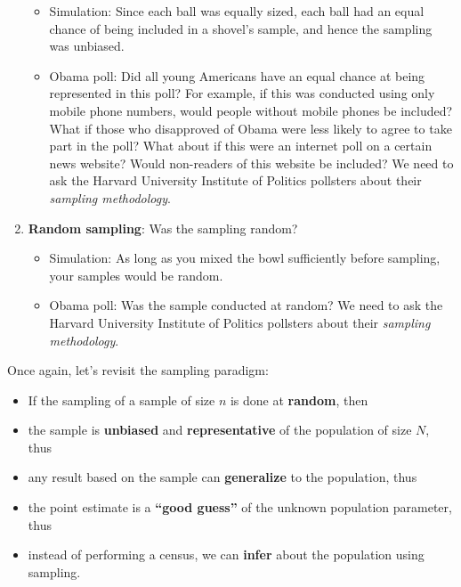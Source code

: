 \documentclass[12pt, krantz2,]{krantz}
\providecommand{\tightlist}{%
  \setlength{\itemsep}{0pt}\setlength{\parskip}{0pt}}
\renewenvironment{quote}{\begin{VF}}{\end{VF}}
\begin{document}
\begin{enumerate}
  \begin{itemize}
  \tightlist
  \item
    Simulation: Since each ball was equally sized, each ball had an equal chance of being included in a shovel's sample, and hence the sampling was unbiased.
  \item
    Obama poll: Did all young Americans have an equal chance at being represented in this poll? For example, if this was conducted using only mobile phone numbers, would people without mobile phones be included? What if those who disapproved of Obama were less likely to agree to take part in the poll? What about if this were an internet poll on a certain news website? Would non-readers of this website be included? We need to ask the Harvard University Institute of Politics pollsters about their \emph{sampling methodology}.
  \end{itemize}
\item
  \textbf{Random sampling}: Was the sampling random?

  \begin{itemize}
  \tightlist
  \item
    Simulation: As long as you mixed the bowl sufficiently before sampling, your samples would be random.
  \item
    Obama poll: Was the sample conducted at random? We need to ask the Harvard University Institute of Politics pollsters about their \emph{sampling methodology}.
  \end{itemize}
\end{enumerate}

Once again, let's revisit the sampling paradigm:

\begin{quote}
\begin{itemize}
\tightlist
\item
  If the sampling of a sample of size \(n\) is done at \textbf{random}, then
\item
  the sample is \textbf{unbiased} and \textbf{representative} of the population of size \(N\), thus
\item
  any result based on the sample can \textbf{generalize} to the population, thus
\item
  the point estimate is a \textbf{``good guess''} of the unknown population parameter, thus
\item
  instead of performing a census, we can \textbf{infer} about the population using sampling.
\end{itemize}
\end{quote}
\end{document}
